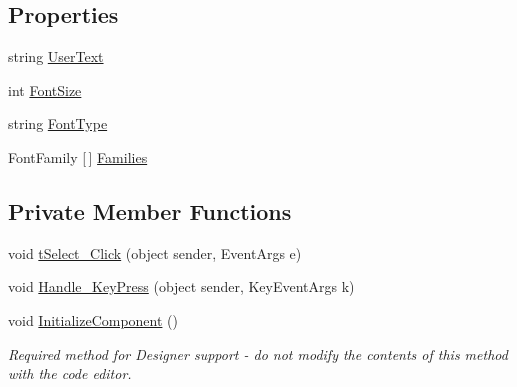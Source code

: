\subsection*{Properties}
\begin{DoxyCompactItemize}
\item 
string \mbox{\hyperlink{class_paint___program_1_1_text_select_a8caa6b68f423e58971e97e90cf978fea}{User\+Text}}
\item 
int \mbox{\hyperlink{class_paint___program_1_1_text_select_a34e1946691554cde280b2a4d3d0be64d}{Font\+Size}}
\item 
string \mbox{\hyperlink{class_paint___program_1_1_text_select_a3dbef208517395b1483f2d6489839025}{Font\+Type}}
\item 
Font\+Family \mbox{[}$\,$\mbox{]} \mbox{\hyperlink{class_paint___program_1_1_text_select_a849232d1c41d945dc2fdf80ed666a7b9}{Families}}
\end{DoxyCompactItemize}
\subsection*{Private Member Functions}
\begin{DoxyCompactItemize}
\item 
void \mbox{\hyperlink{class_paint___program_1_1_text_select_ad30732ccaff1ab2ece04ca32dbbd840d}{t\+Select\+\_\+\+Click}} (object sender, Event\+Args e)
\item 
void \mbox{\hyperlink{class_paint___program_1_1_text_select_abf683438d39c8898627eeab6779ede95}{Handle\+\_\+\+Key\+Press}} (object sender, Key\+Event\+Args k)
\item 
void \mbox{\hyperlink{class_paint___program_1_1_text_select_a7b5e228f1691567c0223fea53de5958c}{Initialize\+Component}} ()
\begin{DoxyCompactList}\small\item\em Required method for Designer support -\/ do not modify the contents of this method with the code editor. \end{DoxyCompactList}\end{DoxyCompactItemize}

